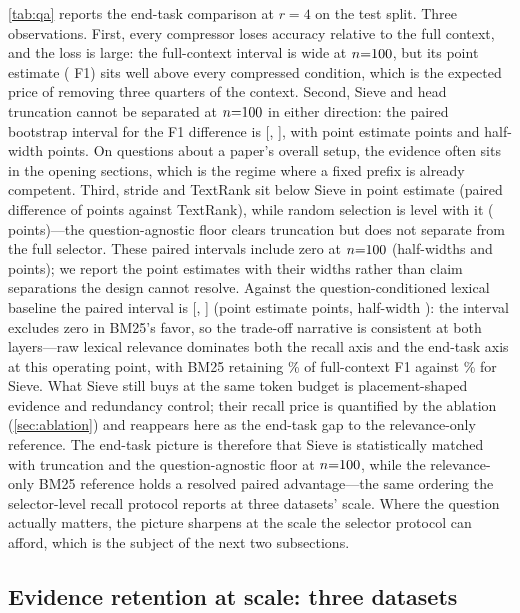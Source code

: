 \documentclass[preprint,12pt]{elsarticle}
\theoremstyle{remark}
\newcommand{\method}{Sieve}
\begin{document}
\autoref{tab:qa} reports the end-task comparison at $r=4$ on the test
split. Three observations. First, every compressor loses accuracy
relative to the full context, and the loss is large: the full-context
interval is wide at $n{=}100$, but its point estimate (\QAFullF{} F1)
sits well above every compressed condition, which is the expected
price of removing three quarters of the context. Second, \method{} and
head truncation cannot be separated at $n{=}100$ in either direction:
the paired bootstrap interval for the F1 difference is
[\QAPairSHLo, \QAPairSHHi], with point estimate \QAPairSH{} points
and half-width \QAPairSHHW{} points. On
questions about a paper's overall setup, the evidence often sits in
the opening sections, which is the regime where a fixed prefix is
already competent. Third, stride and TextRank sit below
\method{} in point estimate (paired difference of \QAPairSTR{} points
against TextRank), while random selection is level with it
(\QAPairSRan{} points)---the question-agnostic floor clears truncation
but does not separate from the full selector. These paired intervals
include zero at $n{=}100$ (half-widths \QAPairSTRHW{} and
\QAPairSRanHW{} points); we report the point estimates with their
widths rather than claim separations the design cannot resolve.
\ifdefined\QAPairSBm Against the question-conditioned lexical
baseline the paired interval is
[\QAPairSBmLo, \QAPairSBmHi] (point estimate \QAPairSBm{} points,
half-width \QAPairSBmHW{}): the interval excludes zero in BM25's favor,
so the trade-off narrative is consistent at both layers---raw lexical
relevance dominates both the recall axis and the end-task axis at this
operating point, with BM25 retaining \QABmRetain\% of full-context F1
against \QASieRetain\% for \method{}. What \method{} still buys at the
same token budget is placement-shaped evidence and redundancy control;
their recall price is quantified by the ablation
(\autoref{sec:ablation}) and reappears here as the end-task gap to the
relevance-only reference.
\fi{} The end-task picture is therefore that \method{}
is statistically matched with truncation and the question-agnostic
floor at $n{=}100$, while the relevance-only BM25 reference holds a
resolved paired advantage---the same ordering the selector-level
recall protocol reports at three datasets' scale. Where the question
actually matters, the picture
sharpens at the scale the selector protocol can afford, which is the
subject of the next two subsections.

\subsection{Evidence retention at scale: three datasets}
\label{sec:recall}
\end{document}
